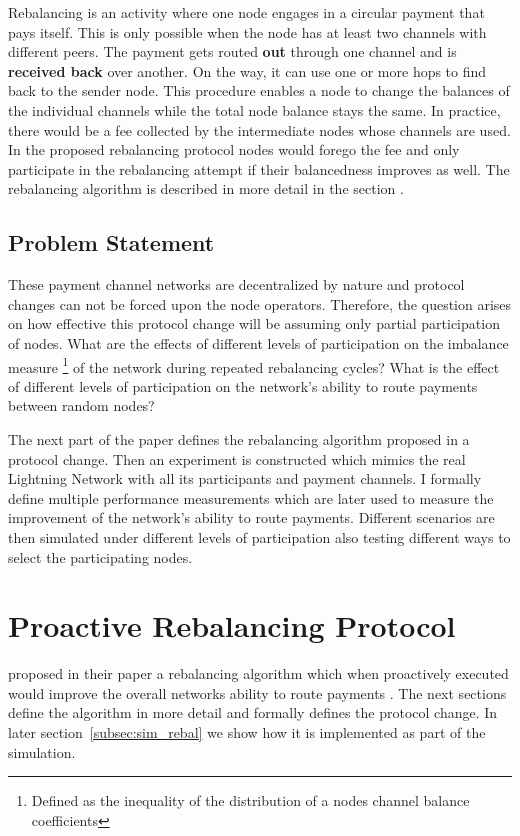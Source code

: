\documentclass[final]{fhnwreport}       %
\begin{document}
Rebalancing is an activity where one node engages in a circular payment that pays itself. This is only possible when the node has at least two channels with different peers. The payment gets routed \textbf{out} through one channel and is \textbf{received back} over another. On the way, it can use one or more hops to find back to the sender node. This procedure enables a node to change the balances of the individual channels while the total node balance stays the same. In practice, there would be a fee collected by the intermediate nodes whose channels are used. In the proposed rebalancing protocol nodes would forego the fee and only participate in the rebalancing attempt if their balancedness improves as well. The rebalancing algorithm is described in more detail in the section . 


\subsection{Problem Statement}
These payment channel networks are decentralized by nature and protocol changes can not be forced upon the node operators. Therefore, the question arises on how effective this protocol change will be assuming only partial participation of nodes. What are the effects of different levels of participation on the imbalance measure \footnote{Defined as the inequality of the distribution of a nodes channel balance coefficients} of the network during repeated rebalancing cycles? What is the effect of different levels of participation on the network's ability to route payments between random nodes? 

The next part of the paper defines the rebalancing algorithm proposed in a protocol change. Then an experiment is constructed which mimics the real Lightning Network with all its participants and payment channels. I formally define multiple performance measurements which are later used to measure the improvement of the network's ability to route payments. Different scenarios are then simulated under different levels of participation also testing different ways to select the participating nodes.

\newpage
\section{Proactive Rebalancing Protocol}
\citeauthor{pickhardt_imbalance_2019} proposed in their paper a rebalancing algorithm which when proactively executed would improve the overall networks ability to route payments \citep{pickhardt_imbalance_2019}. The next sections define the algorithm in more detail and formally defines the protocol change. In later section~\ref{subsec:sim_rebal} we show how it is implemented as part of the simulation.
\end{document}
